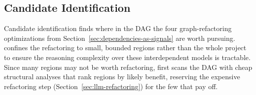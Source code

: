 

\subsection{Candidate Identification}
\label{sec:candidate-identification}

Candidate identification finds where in the DAG  the four graph-refactoring optimizations from Section~\ref{sec:dependencies-as-signals} are worth pursuing.
\tool{} confines the refactoring to small, bounded regions rather than the whole project to ensure  the reasoning complexity over these interdependent models is tractable.
Since many regions may not be worth refactoring, \tool{} first scans the  DAG with cheap structural analyses that rank regions by likely benefit, reserving the expensive refactoring step (Section~\ref{sec:llm-refactoring}) for the few that pay off.

